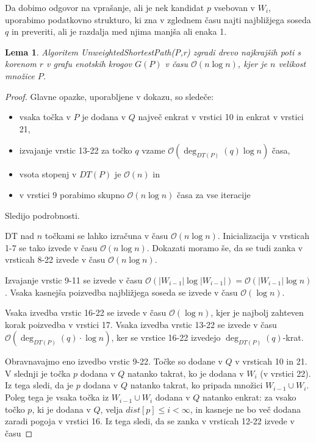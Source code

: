 \documentclass[a4paper, 12pt]{book}
\newcommand{\OO}{\ensuremath{\mathcal{O}}} %
\newtheorem{lema}[izrek]{Lema}
\begin{document}
Da dobimo odgovor na vprašanje, ali je nek kandidat $p$ vsebovan v $W_i$, uporabimo podatkovno strukturo, ki zna v zglednem času najti najbližjega soseda $q$ in preveriti, ali je razdalja med njima manjša ali enaka 1.

\begin{lema}
\label{lema3}
Algoritem \textit{Unweigh\-ted\-Shor\-test\-Path(P,r)} zgradi drevo najkrajših poti s korenom $r$ v grafu enotskih krogov $G(P)$ v času $\OO(n\log n)$, kjer je $n$ velikost množice $P$.
\end{lema}

\begin{proof}
Glavne opazke, uporabljene v dokazu, so sledeče:
\begin{itemize}
\item vsaka točka v $P$ je dodana v $Q$ največ enkrat v vrstici 10 in enkrat v vrstici 21,
\item izvajanje vrstic 13-22 za točko $q$ vzame $\OO(\deg_{DT(P)}(q)\log n)$ časa,
\item vsota stopenj v $DT(P)$ je $\OO(n)$ in
\item v vrstici 9 porabimo skupno $\OO(n\log n)$ časa za vse iteracije
\end{itemize}
Sledijo podrobnosti.

DT nad $n$ točkami se lahko izračuna v času $\OO(n\log n)$. Inicializacija v vrsticah 1-7 se tako izvede v času $\OO(n\log n)$. Dokazati moramo še, da se tudi zanka v vrsticah 8-22 izvede v času $\OO(n\log n)$.

Izvajanje vrstic 9-11 se izvede v času $\OO(|W_{i-1}|\log |W_{i-1}|) = \OO(|W_{i-1}|\log n)$. Vsaka kasnejša poizvedba najbližjega soseda se izvede v času $\OO(\log n)$.

Vsaka izvedba vrstic 16-22 se izvede v času $\OO(\log n)$, kjer je najbolj zahteven korak poizvedba v vrstici 17. Vsaka izvedba vrstic 13-22 se izvede v času $\OO(\deg_{DT(P)}(q)\cdot\log n)$, ker se vrstice 16-22 izvedejo $\deg_{DT(P)}(q)$-krat.

Obravnavajmo eno izvedbo vrstic 9-22. Točke so dodane v $Q$ v vrsticah 10 in 21. V slednji je točka $p$ dodana v $Q$ natanko takrat, ko je dodana v $W_i$ (v vrstici 22). Iz tega sledi, da je $p$ dodana v $Q$ natanko takrat, ko pripada množici $W_{i-1}\cup W_i$. Poleg tega je vsaka točka iz $W_{i-1}\cup W_i$ dodana v $Q$ natanko enkrat: za vsako točko $p$, ki je dodana v $Q$, velja $dist[p]\leq i < \infty$, in kasneje ne bo več dodana zaradi pogoja v vrstici 16. Iz tega sledi, da se zanka v vrsticah 12-22 izvede v času


\end{proof}
\end{document}
